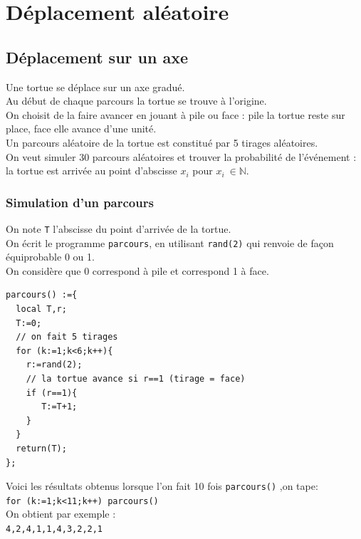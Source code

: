 \documentclass[a4paper,11pt]{book}
\begin{document}
 
\section{D\'eplacement al\'eatoire}
\subsection{D\'eplacement sur un axe}
Une tortue se d\'eplace sur un axe gradu\'e.\\
Au d\'ebut de chaque parcours la tortue se trouve \`a l'origine.\\
On choisit de la faire avancer en jouant \`a pile ou face :
pile la tortue reste sur place,
face elle avance d'une unit\'e.\\ 
Un parcours al\'eatoire de la tortue est constitu\'e par 5 tirages al\'eatoires.\\
On veut simuler 30 parcours al\'eatoires et trouver la 
probabilit\'e de l'\'ev\'enement : la tortue est arriv\'ee  au point d'abscisse
 $x_i$ pour $x_i \ \in \mathbb{N}$.
\subsubsection{Simulation d'un parcours}\label{sec:deplaxe}
On note {\tt T} l'abscisse du point d'arriv\'ee de la tortue.\\
On \'ecrit le programme {\tt parcours}, en utilisant {\tt rand(2)} qui renvoie 
de fa\c{c}on \'equiprobable 0 ou 1.\\
On consid\`ere que 0 correspond \`a pile et correspond 1 \`a face.
\begin{verbatim}
parcours() :={
  local T,r;
  T:=0;
  // on fait 5 tirages
  for (k:=1;k<6;k++){ 
    r:=rand(2);
    // la tortue avance si r==1 (tirage = face)
    if (r==1){
       T:=T+1;
    }
  }
  return(T);
}; 
\end{verbatim} 
Voici les r\'esultats obtenus lorsque l'on fait  10 fois 
{\tt parcours()} ,on tape:\\
{\tt for (k:=1;k<11;k++){ parcours()}}\\
On obtient par exemple :\\
{\tt 4,2,4,1,1,4,3,2,2,1}
\end{document}
